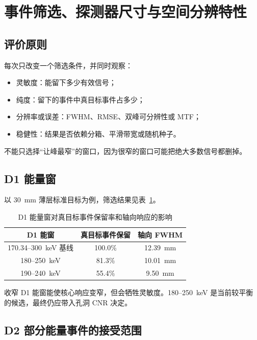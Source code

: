 \documentclass[UTF8,a4paper,zihao=-4,fontset=fandol]{ctexart}
\begin{document}
\section{事件筛选、探测器尺寸与空间分辨特性}

\subsection{评价原则}

每次只改变一个筛选条件，并同时观察：

\begin{itemize}
  \item 灵敏度：能留下多少有效信号；
  \item 纯度：留下的事件中真目标事件占多少；
  \item 分辨率或误差：FWHM、RMSE、双峰可分辨性或 MTF；
  \item 稳健性：结果是否依赖分箱、平滑带宽或随机种子。
\end{itemize}

不能只选择“让峰最窄”的窗口，因为很窄的窗口可能把绝大多数信号都删掉。

\subsection{D1 能量窗}

以 30~mm 薄层标准目标为例，筛选结果见表~\ref{tab:d1-window}。

\begin{table}[htbp]
  \centering
  \caption{D1 能量窗对真目标事件保留率和轴向响应的影响}
  \label{tab:d1-window}
  \begin{tabular}{@{}ccc@{}}
    \toprule
    D1 能窗 & 真目标事件保留 & 轴向 FWHM \\
    \midrule
    170.34--300~keV 基线 & 100.0\% & 12.39~mm \\
    180--250~keV & 81.3\% & 10.01~mm \\
    190--240~keV & 55.4\% & 9.50~mm \\
    \bottomrule
  \end{tabular}
\end{table}

收窄 D1 能窗能使核心响应变窄，但会牺牲灵敏度。180--250~keV 是当前较平衡
的候选，最终仍应带入孔洞 CNR 决定。

\subsection{D2 部分能量事件的接受范围}
\end{document}
